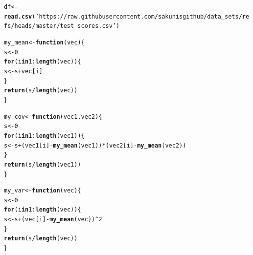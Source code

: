 \documentclass[11pt, a4paper]{article}\usepackage[]{graphicx}\usepackage[]{xcolor}
\makeatletter
\newcommand{\hlnum}[1]{\textcolor[rgb]{0.686,0.059,0.569}{#1}}%
\newcommand{\hlsng}[1]{\textcolor[rgb]{0.192,0.494,0.8}{#1}}%
\newcommand{\hlopt}[1]{\textcolor[rgb]{0,0,0}{#1}}%
\newcommand{\hldef}[1]{\textcolor[rgb]{0.345,0.345,0.345}{#1}}%
\newcommand{\hlkwa}[1]{\textcolor[rgb]{0.161,0.373,0.58}{\textbf{#1}}}%
\newcommand{\hlkwb}[1]{\textcolor[rgb]{0.69,0.353,0.396}{#1}}%
\newcommand{\hlkwc}[1]{\textcolor[rgb]{0.333,0.667,0.333}{#1}}%
\newcommand{\hlkwd}[1]{\textcolor[rgb]{0.737,0.353,0.396}{\textbf{#1}}}%
\newenvironment{kframe}{%
 \def\at@end@of@kframe{}%
 \ifinner\ifhmode%
  \def\at@end@of@kframe{\end{minipage}}%
  \begin{minipage}{\columnwidth}%
 \fi\fi%
 \def\FrameCommand##1{\hskip\@totalleftmargin \hskip-\fboxsep
 \colorbox{shadecolor}{##1}\hskip-\fboxsep
     \hskip-\linewidth \hskip-\@totalleftmargin \hskip\columnwidth}%
 \MakeFramed {\advance\hsize-\width
   \@totalleftmargin\z@ \linewidth\hsize
   \@setminipage}}%
 {\par\unskip\endMakeFramed%
 \at@end@of@kframe}
\newenvironment{knitrout}{}{} %
\makeatother
\begin{document}
\begin{knitrout}\footnotesize
{}\color{fgcolor}\begin{kframe}
\begin{alltt}
\hldef{df} \hlkwb{<-} \hlkwd{read.csv}\hldef{(}\hlsng{'https://raw.githubusercontent.com/sakunisgithub/data_sets/refs/heads/master/test_scores.csv'}\hldef{)}
\end{alltt}
\end{kframe}
\end{knitrout}

\begin{knitrout}
\color{fgcolor}\begin{kframe}
\begin{alltt}
\hldef{my_mean} \hlkwb{<-} \hlkwa{function}\hldef{(}\hlkwc{vec}\hldef{)\{}
  \hldef{s} \hlkwb{<-} \hlnum{0}
  \hlkwa{for} \hldef{(i} \hlkwa{in} \hlnum{1}\hlopt{:}\hlkwd{length}\hldef{(vec)) \{}
    \hldef{s} \hlkwb{<-} \hldef{s} \hlopt{+} \hldef{vec[i]}
  \hldef{\}}
  \hlkwd{return}\hldef{(s}\hlopt{/}\hlkwd{length}\hldef{(vec))}
\hldef{\}}
\end{alltt}
\end{kframe}
\end{knitrout}

\begin{knitrout}
\color{fgcolor}\begin{kframe}
\begin{alltt}
\hldef{my_cov} \hlkwb{<-} \hlkwa{function}\hldef{(}\hlkwc{vec1}\hldef{,} \hlkwc{vec2}\hldef{)\{}
  \hldef{s} \hlkwb{<-} \hlnum{0}
  \hlkwa{for} \hldef{(i} \hlkwa{in} \hlnum{1}\hlopt{:}\hlkwd{length}\hldef{(vec1)) \{}
    \hldef{s} \hlkwb{<-} \hldef{s} \hlopt{+} \hldef{(vec1[i]} \hlopt{-} \hlkwd{my_mean}\hldef{(vec1))} \hlopt{*} \hldef{(vec2[i]} \hlopt{-} \hlkwd{my_mean}\hldef{(vec2))}
  \hldef{\}}
  \hlkwd{return}\hldef{(s}\hlopt{/}\hlkwd{length}\hldef{(vec1))}
\hldef{\}}
\end{alltt}
\end{kframe}
\end{knitrout}

\begin{knitrout}
\color{fgcolor}\begin{kframe}
\begin{alltt}
\hldef{my_var} \hlkwb{<-} \hlkwa{function}\hldef{(}\hlkwc{vec}\hldef{)\{}
  \hldef{s} \hlkwb{<-} \hlnum{0}
  \hlkwa{for} \hldef{(i} \hlkwa{in} \hlnum{1}\hlopt{:}\hlkwd{length}\hldef{(vec)) \{}
    \hldef{s} \hlkwb{<-} \hldef{s} \hlopt{+} \hldef{(vec[i]} \hlopt{-} \hlkwd{my_mean}\hldef{(vec))}\hlopt{^}\hlnum{2}
  \hldef{\}}
  \hlkwd{return}\hldef{(s}\hlopt{/}\hlkwd{length}\hldef{(vec))}
\hldef{\}}
\end{alltt}
\end{kframe}
\end{knitrout}
\end{document}
